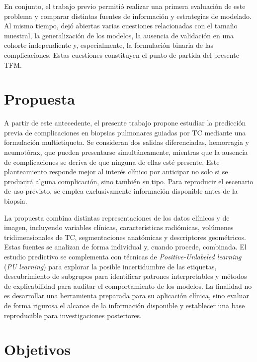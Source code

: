 En conjunto, el trabajo previo permitió realizar una primera evaluación de este problema y comparar distintas fuentes de información y estrategias de modelado. Al mismo tiempo, dejó abiertas varias cuestiones relacionadas con el tamaño muestral, la generalización de los modelos, la ausencia de validación en una cohorte independiente y, especialmente, la formulación binaria de las complicaciones. Estas cuestiones constituyen el punto de partida del presente TFM.


\section{Propuesta}

A partir de este antecedente, el presente trabajo propone estudiar la predicción previa de complicaciones en biopsias pulmonares guiadas por TC mediante una formulación multietiqueta. Se consideran dos salidas diferenciadas, hemorragia y neumotórax, que pueden presentarse simultáneamente, mientras que la ausencia de complicaciones se deriva de que ninguna de ellas esté presente. Este planteamiento responde mejor al interés clínico por anticipar no solo si se producirá alguna complicación, sino también su tipo. Para reproducir el escenario de uso previsto, se emplea exclusivamente información disponible antes de la biopsia.

La propuesta combina distintas representaciones de los datos clínicos y de imagen, incluyendo variables clínicas, características radiómicas, volúmenes tridimensionales de TC, segmentaciones anatómicas y descriptores geométricos. Estas fuentes se analizan de forma individual y, cuando procede, combinada. El estudio predictivo se complementa con técnicas de \textit{Positive-Unlabeled learning} (\textit{PU learning}) para explorar la posible incertidumbre de las etiquetas, descubrimiento de subgrupos para identificar patrones interpretables y métodos de explicabilidad para auditar el comportamiento de los modelos. La finalidad no es desarrollar una herramienta preparada para su aplicación clínica, sino evaluar de forma rigurosa el alcance de la información disponible y establecer una base reproducible para investigaciones posteriores.


\section{Objetivos}


